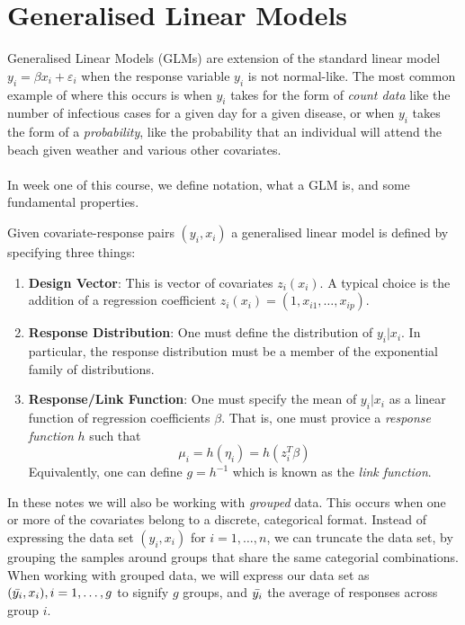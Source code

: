 
\section{Generalised Linear Models}

Generalised Linear Models (GLMs) are extension of the standard linear model $y_i = \beta x_i + \varepsilon_i$ when the response variable $y_i$ is not normal-like. The most common example of where this occurs is when $y_i$ takes for the form of \textit{count data} like the number of infectious cases for a given day for a given disease, or when $y_i$ takes the form of a \textit{probability}, like the probability that an individual will attend the beach given weather and various other covariates. \\
\\
In week one of this course, we define notation, what a GLM is, and some fundamental properties.

\begin{definition} Given covariate-response pairs $(y_i, x_i)$ a generalised linear model is defined by specifying three things:
\begin{enumerate}
    \item \textbf{Design Vector}: This is vector of covariates $z_i(x_i)$. A typical choice is the addition of a regression coefficient $z_i(x_i) = (1, x_{i1}, \dots, x_{ip})$. 

    \item \textbf{Response Distribution}: One must define the distribution of $y_i | x_i$. In particular, the response distribution must be a member of the exponential family of distributions. 
    
    \item \textbf{Response/Link Function}: One must specify the mean of $y_i | x_i$ as a linear function of regression coefficients $\beta$. That is, one must provice a \textit{response function} $h$ such that 
    $$\mu_i = h(\eta_i) = h(z_i^T\beta)$$
    Equivalently, one can define $g = h^{-1}$ which is known as the \textit{link function}.
\end{enumerate}
\end{definition}
\vspace{10pt}
In these notes we will also be working with \textit{grouped} data. This occurs when one or more of the covariates belong to a discrete, categorical format. Instead of expressing the data set $(y_i, x_i)$ for $i=1,\dots,n$, we can truncate the data set, by grouping the samples around groups that share the same categorial combinations. When working with grouped data, we will express our data set as $(\Bar{y_i}, x_i), i=1,\dots,g$ to signify $g$ groups, and $\Bar{y_i}$ the average of responses across group $i$.

